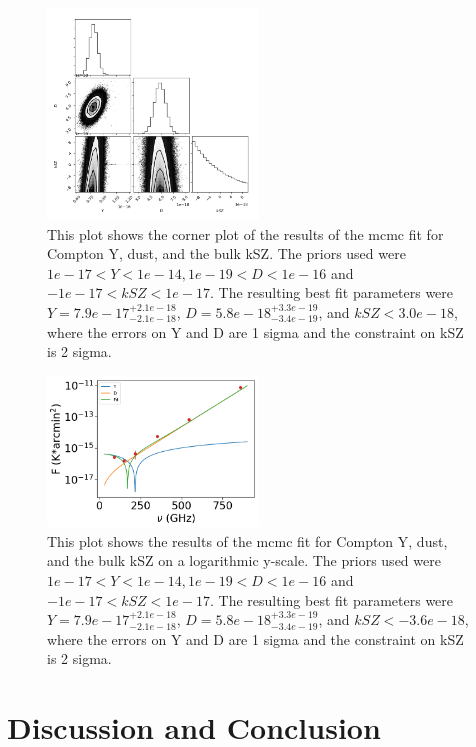 \documentclass{princeton_astro_thesis}
\begin{document}
\begin{figure}[h]
\centering
\includegraphics[width=0.5\textwidth]{../BulkkSZplot.png}
\caption{This plot shows the corner plot of the results of the mcmc fit for Compton Y, dust, and the bulk kSZ. The priors used were $ 1e-17 < Y < 1e-14, 1e-19< D < 1e-16$ and $-1e-17 < kSZ <1e-17.$ The resulting best fit parameters were $Y=7.9e-17^{+2.1e-18}_{-2.1e-18}$, $D=5.8e-18^{+3.3e-19}_{-3.4e-19}$, and $kSZ<3.0e-18$, where the errors on Y and D are 1 sigma and the constraint on kSZ is 2 sigma.}
\end{figure}

\begin{figure}[h]
\centering
\includegraphics[width=0.5\textwidth]{../redmapper_apfluxes_kSZfitlog.png}
\caption{This plot shows  the results of the mcmc fit for Compton Y, dust, and the bulk kSZ on a logarithmic y-scale. The priors used were $ 1e-17 < Y < 1e-14, 1e-19< D < 1e-16$ and $-1e-17 < kSZ <1e-17.$ The resulting best fit parameters were $Y=7.9e-17^{+2.1e-18}_{-2.1e-18}$, $D=5.8e-18^{+3.3e-19}_{-3.4e-19}$, and $kSZ<-3.6e-18$, where the errors on Y and D are 1 sigma and the constraint on kSZ is 2 sigma.} %
\end{figure}


\chapter{Discussion and Conclusion}
\end{document}
